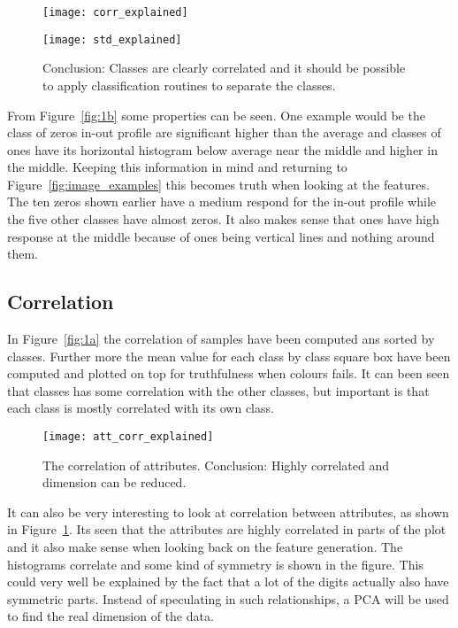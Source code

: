 \documentclass[10pt,a4paper]{report}
\begin{document}
\begin{figure}[hbtp]
\begin{minipage}[t]{.49\linewidth}
\centering
\texttt{[image: corr\_explained]}
\end{minipage}%
\hfill%
\begin{minipage}[t]{.49\linewidth}
\centering
\texttt{[image: std\_explained]}
\end{minipage}
\caption{Conclusion: Classes are clearly correlated and it should be possible to apply classification routines to separate the classes. }
\end{figure}

From Figure~\ref{fig:1b} some properties can be seen. One example would be the class of zeros in-out profile are significant higher than the average and classes of ones have its horizontal histogram below average near the middle and higher in the middle. Keeping this information in mind and returning to Figure~\ref{fig:image_examples} this becomes truth when looking at the features. The ten zeros shown earlier have a medium respond for the in-out profile while the five other classes have almost zeros. It also makes sense that ones have high response at the middle because of ones being vertical lines and nothing around them.

\subsection{Correlation}
In Figure~\ref{fig:1a} the correlation of samples have been computed ans sorted by classes. Further more the mean value for each class by class square box have been computed and plotted on top for truthfulness when colours fails. It can been seen that classes has some correlation with the other classes, but important is that each class is mostly correlated with its own class.

\begin{figure}[hbtp]
\centering
\texttt{[image: att\_corr\_explained]}
\caption{The correlation of attributes. Conclusion: Highly correlated and dimension can be reduced.\label{fig:att_corr_explained}}
\end{figure}

It can also be very interesting to look at correlation between attributes, as shown in Figure~\ref{fig:att_corr_explained}. Its seen that the attributes are highly correlated in parts of the plot and it also make sense when looking back on the feature generation. The histograms correlate and some kind of symmetry is shown in the figure. This could very well be explained by the fact that a lot of the digits actually also have symmetric parts. Instead of speculating in such relationships, a PCA will be used to find the real dimension of the data.  
\end{document}
